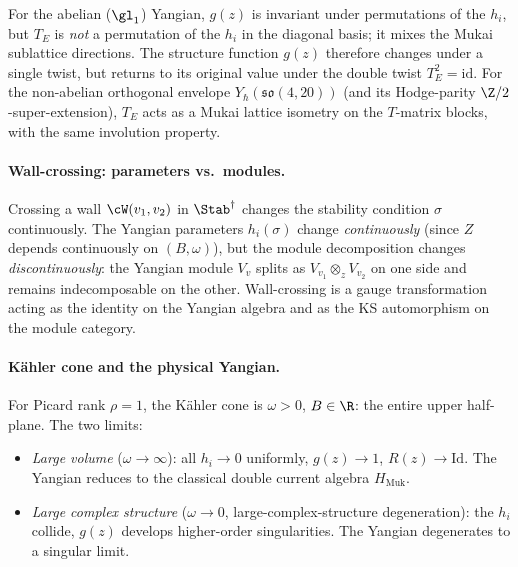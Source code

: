 For the abelian ($\gl_1$) Yangian, $g(z)$ is invariant under permutations of the $h_i$, but $T_E$ is \emph{not} a permutation of the $h_i$ in the diagonal basis; it mixes the Mukai sublattice directions. The structure function $g(z)$ therefore changes under a single twist, but returns to its original value under the double twist $T_E^2 = \mathrm{id}$. For the non-abelian orthogonal envelope $Y_\hbar(\mathfrak{so}(4, 20))$ (and its Hodge-parity $\Z/2$-super-extension), $T_E$ acts as a Mukai lattice isometry on the $T$-matrix blocks, with the same involution property.

\paragraph{Wall-crossing: parameters vs.\ modules.}
Crossing a wall $\cW(v_1, v_2)$ in $\Stab^\dagger$ changes the stability condition $\sigma$ continuously. The Yangian parameters $h_i(\sigma)$ change \emph{continuously} (since $Z$ depends continuously on $(B, \omega)$), but the module decomposition changes \emph{discontinuously}: the Yangian module $V_v$ splits as $V_{v_1} \otimes_z V_{v_2}$ on one side and remains indecomposable on the other. Wall-crossing is a gauge transformation acting as the identity on the Yangian algebra and as the KS automorphism on the module category.

\paragraph{K\"ahler cone and the physical Yangian.}
For Picard rank $\rho = 1$, the K\"ahler cone is $\omega > 0$, $B \in \R$: the entire upper half-plane. The two limits:
\begin{itemize}
\item \emph{Large volume} ($\omega \to \infty$): all $h_i \to 0$ uniformly, $g(z) \to 1$, $R(z) \to \mathrm{Id}$. The Yangian reduces to the classical double current algebra $H_{\mathrm{Muk}}$.
\item \emph{Large complex structure} ($\omega \to 0$, large-complex-structure degeneration): the $h_i$ collide, $g(z)$ develops higher-order singularities. The Yangian degenerates to a singular limit.
\end{itemize}




